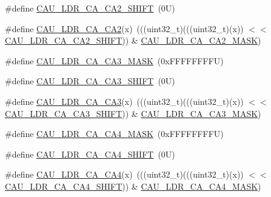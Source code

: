 \begin{DoxyCompactItemize}
\item 
\#define \mbox{\hyperlink{group___c_a_u___register___masks_gaf922a639148e6bfa357029f20b0d1aef}{C\+A\+U\+\_\+\+L\+D\+R\+\_\+\+C\+A\+\_\+\+C\+A2\+\_\+\+S\+H\+I\+FT}}~(0\+U)
\item 
\#define \mbox{\hyperlink{group___c_a_u___register___masks_ga21841b16ab149bb4c2d3d96657e064e1}{C\+A\+U\+\_\+\+L\+D\+R\+\_\+\+C\+A\+\_\+\+C\+A2}}(x)~(((uint32\+\_\+t)(((uint32\+\_\+t)(x)) $<$$<$ \mbox{\hyperlink{group___c_a_u___register___masks_gaf922a639148e6bfa357029f20b0d1aef}{C\+A\+U\+\_\+\+L\+D\+R\+\_\+\+C\+A\+\_\+\+C\+A2\+\_\+\+S\+H\+I\+FT}})) \& \mbox{\hyperlink{group___c_a_u___register___masks_gada0be8752ff081d41bd530392613175b}{C\+A\+U\+\_\+\+L\+D\+R\+\_\+\+C\+A\+\_\+\+C\+A2\+\_\+\+M\+A\+SK}})
\item 
\#define \mbox{\hyperlink{group___c_a_u___register___masks_gadc483f48a51a7e423bd122f4175d4dd8}{C\+A\+U\+\_\+\+L\+D\+R\+\_\+\+C\+A\+\_\+\+C\+A3\+\_\+\+M\+A\+SK}}~(0x\+F\+F\+F\+F\+F\+F\+F\+F\+U)
\item 
\#define \mbox{\hyperlink{group___c_a_u___register___masks_ga31b5ff2083be706bf9f333d80d4992fc}{C\+A\+U\+\_\+\+L\+D\+R\+\_\+\+C\+A\+\_\+\+C\+A3\+\_\+\+S\+H\+I\+FT}}~(0\+U)
\item 
\#define \mbox{\hyperlink{group___c_a_u___register___masks_ga01e9876211bc7569a7fed8b22019a8aa}{C\+A\+U\+\_\+\+L\+D\+R\+\_\+\+C\+A\+\_\+\+C\+A3}}(x)~(((uint32\+\_\+t)(((uint32\+\_\+t)(x)) $<$$<$ \mbox{\hyperlink{group___c_a_u___register___masks_ga31b5ff2083be706bf9f333d80d4992fc}{C\+A\+U\+\_\+\+L\+D\+R\+\_\+\+C\+A\+\_\+\+C\+A3\+\_\+\+S\+H\+I\+FT}})) \& \mbox{\hyperlink{group___c_a_u___register___masks_gadc483f48a51a7e423bd122f4175d4dd8}{C\+A\+U\+\_\+\+L\+D\+R\+\_\+\+C\+A\+\_\+\+C\+A3\+\_\+\+M\+A\+SK}})
\item 
\#define \mbox{\hyperlink{group___c_a_u___register___masks_gae6080270193ec350954328f66ffc6526}{C\+A\+U\+\_\+\+L\+D\+R\+\_\+\+C\+A\+\_\+\+C\+A4\+\_\+\+M\+A\+SK}}~(0x\+F\+F\+F\+F\+F\+F\+F\+F\+U)
\item 
\#define \mbox{\hyperlink{group___c_a_u___register___masks_ga401e274bfc5075ec0e72d885071c3415}{C\+A\+U\+\_\+\+L\+D\+R\+\_\+\+C\+A\+\_\+\+C\+A4\+\_\+\+S\+H\+I\+FT}}~(0\+U)
\item 
\#define \mbox{\hyperlink{group___c_a_u___register___masks_gad677866f6f1b4e9731a6852124fc13c8}{C\+A\+U\+\_\+\+L\+D\+R\+\_\+\+C\+A\+\_\+\+C\+A4}}(x)~(((uint32\+\_\+t)(((uint32\+\_\+t)(x)) $<$$<$ \mbox{\hyperlink{group___c_a_u___register___masks_ga401e274bfc5075ec0e72d885071c3415}{C\+A\+U\+\_\+\+L\+D\+R\+\_\+\+C\+A\+\_\+\+C\+A4\+\_\+\+S\+H\+I\+FT}})) \& \mbox{\hyperlink{group___c_a_u___register___masks_gae6080270193ec350954328f66ffc6526}{C\+A\+U\+\_\+\+L\+D\+R\+\_\+\+C\+A\+\_\+\+C\+A4\+\_\+\+M\+A\+SK}})
$$
\end{DoxyCompactItemize}
